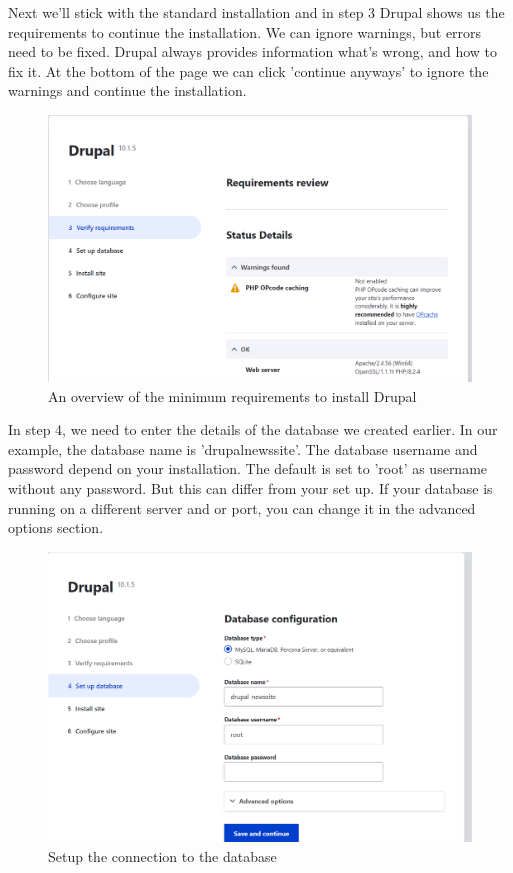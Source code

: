 Next we'll stick with the standard installation and in step 3 Drupal shows us the requirements to continue the installation. We can ignore warnings, but errors need to be fixed. Drupal always provides information what's wrong, and how to fix it. At the bottom of the page we can click 'continue anyways' to ignore the warnings and continue the installation.

\begin{figure}[h]
    \centering
    \includegraphics[width=1\linewidth]{img/ch3/install_step3}
    \caption{An overview of the minimum requirements to install Drupal}
    \label{fig:install_step3}
\end{figure}

In step 4, we need to enter the details of the database we created earlier. In our example, the database name is 'drupal\textunderscore newssite'. The database username and password depend on your installation. The default is set to 'root' as username without any password. But this can differ from your set up. If your database is running on a different server and or port, you can change it in the advanced options section.

\begin{figure}[h]
    \centering
    \includegraphics[width=1\linewidth]{img/ch3/install_step4}
    \caption{Setup the connection to the database}
    \label{fig:install_step4}
\end{figure}


